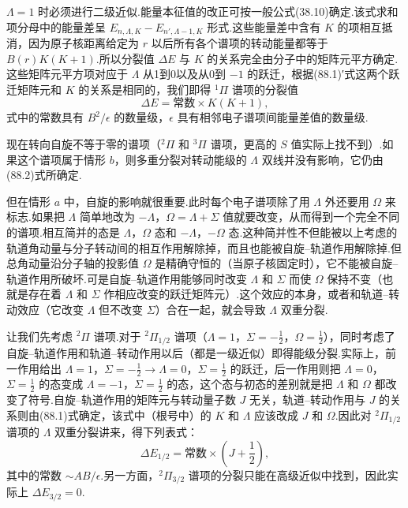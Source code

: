 $\Lambda=1$ 时必须进行二级近似.能量本征值的改正可按一般公式(38.10)确定.该式求和项分母中的能量差呈 $E_{n,\Lambda,K}-E_{n',\Lambda-1,K}$ 形式.这些能量差中含有 $K$ 的项相互抵消，因为原子核距离给定为 $r$ 以后所有各个谱项的转动能量都等于 $B(r)K(K+1)$.所以分裂值 $\Delta E$ 与 $K$ 的关系完全由分子中的矩阵元平方确定.这些矩阵元平方项对应于 $\Lambda$ 从1到0以及从0到 $-1$ 的跃迁，根据(88.1)′式这两个跃迁矩阵元和 $K$ 的关系是相同的，我们即得 $^1\Pi$ 谱项的分裂值
\begin{equation}
  \Delta E=\text{常数}\times K(K+1),
\end{equation}
式中的常数具有 $B^2/\epsilon$ 的数量级，$\epsilon$ 具有相邻电子谱项间能量差值的数量级.

现在转向自旋不等于零的谱项（$^2\Pi$ 和 $^3\Pi$ 谱项，更高的 $S$ 值实际上找不到）.如果这个谱项属于情形 $b$，则多重分裂对转动能级的 $\Lambda$ 双线并没有影响，它仍由(88.2)式所确定.

但在情形 $a$ 中，自旋的影响就很重要.此时每个电子谱项除了用 $\Lambda$ 外还要用 $\Omega$ 来标志.如果把 $\Lambda$ 简单地改为 $-\Lambda$，$\Omega=\Lambda+\Sigma$ 值就要改变，从而得到一个完全不同的谱项.相互简并的态是 $\Lambda$，$\Omega$ 态和 $-\Lambda$，$-\Omega$ 态.这种简并性不但能被以上考虑的轨道角动量与分子转动间的相互作用解除掉，而且也能被自旋–轨道作用解除掉.但总角动量沿分子轴的投影值 $\Omega$ 是精确守恒的（当原子核固定时），它不能被自旋–轨道作用所破坏.可是自旋–轨道作用能够同时改变 $\Lambda$ 和 $\Sigma$ 而使 $\Omega$ 保持不变（也就是存在着 $\Lambda$ 和 $\Sigma$ 作相应改变的跃迁矩阵元）.这个效应的本身，或者和轨道–转动效应（它改变 $\Lambda$ 但不改变 $\Sigma$）合在一起，就会导致 $\Lambda$ 双重分裂.

让我们先考虑 $^2\Pi$ 谱项.对于 $^2\Pi_{1/2}$ 谱项（$\Lambda=1$，$\Sigma=-\frac{1}{2}$，$\Omega=\frac{1}{2}$），同时考虑了自旋–轨道作用和轨道–转动作用以后（都是一级近似）即得能级分裂.实际上，前一作用给出 $\Lambda=1$，$\Sigma=-\frac{1}{2}\to\Lambda=0$，$\Sigma=\frac{1}{2}$ 的跃迁，后一作用则把 $\Lambda=0$，$\Sigma=\frac{1}{2}$ 的态变成 $\Lambda=-1$，$\Sigma=\frac{1}{2}$ 的态，这个态与初态的差别就是把 $\Lambda$ 和 $\Omega$ 都改变了符号.自旋–轨道作用的矩阵元与转动量子数 $J$ 无关，轨道–转动作用与 $J$ 的关系则由(88.1)式确定，该式中（根号中）的 $K$ 和 $\Lambda$ 应该改成 $J$ 和 $\Omega$.因此对 $^2\Pi_{1/2}$ 谱项的 $\Lambda$ 双重分裂讲来，得下列表式：
\begin{equation}
  \Delta E_{1/2}=\text{常数}\times\left(J+\frac{1}{2}\right),
\end{equation}
其中的常数 $\sim AB/\epsilon$.另一方面，$^2\Pi_{3/2}$ 谱项的分裂只能在高级近似中找到，因此实际上 $\Delta E_{3/2}=0$.

